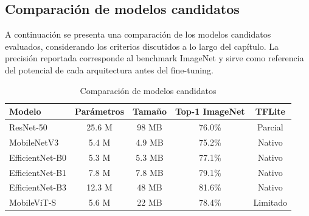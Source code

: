 \subsection{Comparación de modelos candidatos}

A continuación se presenta una comparación de los modelos candidatos evaluados, considerando los criterios discutidos a lo largo del capítulo. La precisión reportada corresponde al benchmark ImageNet y sirve como referencia del potencial de cada arquitectura antes del fine-tuning.

\begin{table}[H]
\centering
\caption{Comparación de modelos candidatos}
\begin{tabular}{lcccc}
\hline
\textbf{Modelo} & \textbf{Parámetros} & \textbf{Tamaño} & \textbf{Top-1 ImageNet} & \textbf{TFLite} \\
\hline
ResNet-50        & 25.6 M & 98 MB  & 76.0\% & Parcial  \\
MobileNetV3      & 5.4 M  & 4.9 MB & 75.2\% & Nativo   \\
EfficientNet-B0  & 5.3 M  & 5.3 MB & 77.1\% & Nativo   \\
EfficientNet-B1  & 7.8 M  & 7.8 MB & 79.1\% & Nativo   \\
EfficientNet-B3  & 12.3 M & 48 MB  & 81.6\% & Nativo   \\
MobileViT-S      & 5.6 M  & 22 MB  & 78.4\% & Limitado \\
\hline
\end{tabular}
\label{tab:comparacion_modelos}
\end{table}